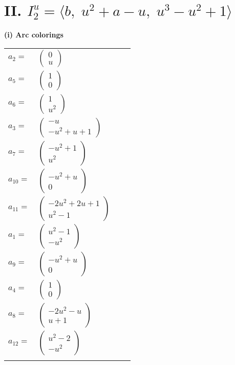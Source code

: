 \documentclass[1p]{elsarticle_modified}
\theoremstyle{definition}
\begin{document}
\centering \section*{II. $I^u_{2}= \langle b,\;u^2+a- u,\;u^3- u^2+1 \rangle$}
\flushleft \textbf{(i) Arc colorings}\\
\begin{tabular}{m{7pt} m{180pt} m{7pt} m{180pt} }
\flushright $a_{2}=$&$\begin{pmatrix}0\\u\end{pmatrix}$ \\
\flushright $a_{5}=$&$\begin{pmatrix}1\\0\end{pmatrix}$ \\
\flushright $a_{6}=$&$\begin{pmatrix}1\\u^2\end{pmatrix}$ \\
\flushright $a_{3}=$&$\begin{pmatrix}- u\\- u^2+u+1\end{pmatrix}$ \\
\flushright $a_{7}=$&$\begin{pmatrix}- u^2+1\\u^2\end{pmatrix}$ \\
\flushright $a_{10}=$&$\begin{pmatrix}- u^2+u\\0\end{pmatrix}$ \\
\flushright $a_{11}=$&$\begin{pmatrix}-2 u^2+2 u+1\\u^2-1\end{pmatrix}$ \\
\flushright $a_{1}=$&$\begin{pmatrix}u^2-1\\- u^2\end{pmatrix}$ \\
\flushright $a_{9}=$&$\begin{pmatrix}- u^2+u\\0\end{pmatrix}$ \\
\flushright $a_{4}=$&$\begin{pmatrix}1\\0\end{pmatrix}$ \\
\flushright $a_{8}=$&$\begin{pmatrix}-2 u^2- u\\u+1\end{pmatrix}$ \\
\flushright $a_{12}=$&$\begin{pmatrix}u^2-2\\- u^2\end{pmatrix}$\\&\end{tabular}
\end{document}
